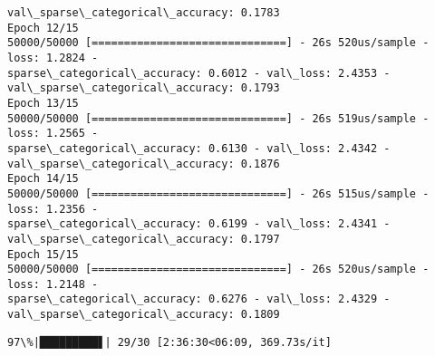 \documentclass[11pt]{article}
\begin{document}
\begin{Verbatim}[commandchars=\\\{\}]
val\_sparse\_categorical\_accuracy: 0.1783
Epoch 12/15
50000/50000 [==============================] - 26s 520us/sample - loss: 1.2824 -
sparse\_categorical\_accuracy: 0.6012 - val\_loss: 2.4353 -
val\_sparse\_categorical\_accuracy: 0.1793
Epoch 13/15
50000/50000 [==============================] - 26s 519us/sample - loss: 1.2565 -
sparse\_categorical\_accuracy: 0.6130 - val\_loss: 2.4342 -
val\_sparse\_categorical\_accuracy: 0.1876
Epoch 14/15
50000/50000 [==============================] - 26s 515us/sample - loss: 1.2356 -
sparse\_categorical\_accuracy: 0.6199 - val\_loss: 2.4341 -
val\_sparse\_categorical\_accuracy: 0.1797
Epoch 15/15
50000/50000 [==============================] - 26s 520us/sample - loss: 1.2148 -
sparse\_categorical\_accuracy: 0.6276 - val\_loss: 2.4329 -
val\_sparse\_categorical\_accuracy: 0.1809
    \end{Verbatim}

    \begin{Verbatim}[commandchars=\\\{\}]
 97\%|█████████▋| 29/30 [2:36:30<06:09, 369.73s/it]
    \end{Verbatim}
\end{document}
